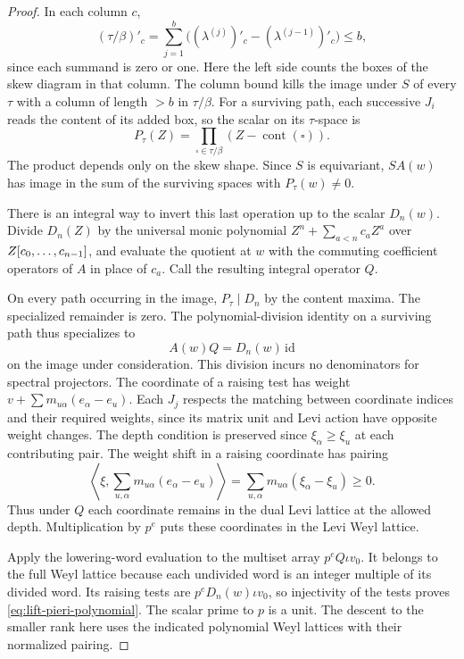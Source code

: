 \begin{proof}
In each column \(c\),
\[
 (\tau/\beta)'_c=\sum_{j=1}^b\bigl((\lambda^{(j)})'_c-(\lambda^{(j-1)})'_c\bigr)\le b,
\]
since each summand is zero or one. Here the left side counts the boxes of the skew diagram in that column. The column bound kills the image under \(S\) of every
\(\tau\) with a column of length \(>b\) in \(\tau/\beta\).
For a surviving path, each successive \(J_i\) reads the
content of its added box, so the scalar on its \(\tau\)-space is
\[
       P_\tau(Z)=\prod_{\square\in\tau/\beta}
                   (Z-\operatorname{cont}(\square)).
\]
The product depends only on the skew shape. Since \(S\)
is equivariant, \(S A(w)\) has image in the sum of the
surviving spaces with \(P_\tau(w)\ne0\).
\label{cor:lift-pieri-cost-3}

There is an integral way to invert this last operation up
to the scalar \(D_n(w)\). Divide \(D_n(Z)\) by the universal
monic polynomial \(Z^n+\sum_{a<n}c_a Z^a\) over
\(Z[c_0,\ldots,c_{n-1}]\), and evaluate the quotient
at \(w\) with the commuting coefficient operators of \(A\)
in place of \(c_a\). Call the resulting integral operator
\(Q\).

On every path occurring in the image,
\(P_\tau\mid D_n\) by the content maxima. The specialized
remainder is zero. The polynomial-division identity on a surviving path thus specializes to
\[
 A(w)Q=D_n(w)\,\mathrm{id}
\]
on the image under consideration.
This division incurs no denominators for spectral
projectors. The coordinate of a raising test has weight
\(v+\sum m_{u\alpha}(e_\alpha-e_u)\).
Each \(J_j\) respects the matching between coordinate
indices and their required weights, since its matrix unit
and Levi action have opposite weight changes. The depth condition is preserved since \(\xi_\alpha\ge\xi_u\) at each contributing pair. The weight shift in a raising coordinate has pairing
\[
 \left\langle\xi,\sum_{u,\alpha}m_{u\alpha}(e_\alpha-e_u)\right\rangle=\sum_{u,\alpha}m_{u\alpha}(\xi_\alpha-\xi_u)\ge0 .
\]
Thus under \(Q\) each coordinate remains in the dual Levi lattice at the allowed depth.
Multiplication by \(p^e\) puts these coordinates in the
Levi Weyl lattice.

Apply the lowering-word evaluation
to the multiset array \(p^e Q\iota v_0\). It belongs to
the full Weyl lattice because each undivided word is an
integer multiple of its divided word. Its raising tests
are \(p^e D_n(w)\iota v_0\), so injectivity of the tests
proves \eqref{eq:lift-pieri-polynomial}. The scalar prime
to \(p\) is a unit. The descent to the smaller rank here
uses the indicated polynomial Weyl lattices with their
normalized pairing.\label{cor:lift-pieri-cost-4}

\end{proof}

